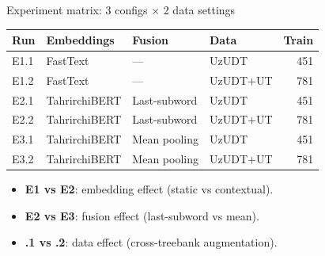 \documentclass{beamer}
\begin{document}
\begin{frame}{Experiment matrix: 3 configs $\times$ 2 data settings}
\centering\small
\begin{tabular}{llllr}
\toprule
\textbf{Run} & \textbf{Embeddings} & \textbf{Fusion} & \textbf{Data}
  & \textbf{Train} \\
\midrule
E1.1 & FastText      & ---          & UzUDT      & 451 \\
E1.2 & FastText      & ---          & UzUDT$+$UT & 781 \\
E2.1 & TahrirchiBERT & Last-subword & UzUDT      & 451 \\
\rowcolor{tumcolor-green!22}
E2.2 & TahrirchiBERT & Last-subword & UzUDT$+$UT & 781 \\
E3.1 & TahrirchiBERT & Mean pooling & UzUDT      & 451 \\
E3.2 & TahrirchiBERT & Mean pooling & UzUDT$+$UT & 781 \\
\bottomrule
\end{tabular}

\vspace{0.3cm}
\footnotesize
\begin{itemize}\setlength\itemsep{2pt}
  \item \textbf{E1 vs E2}: embedding effect (static vs contextual).
  \item \textbf{E2 vs E3}: fusion effect (last-subword vs mean).
  \item \textbf{.1 vs .2}: data effect (cross-treebank augmentation).
\end{itemize}
\end{frame}
\end{document}
